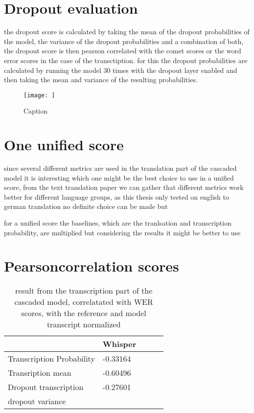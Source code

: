 \section{Dropout evaluation}
the dropout score is calculated by taking the mean of the dropout probabilities of the model, the variance of the dropout probabilities and a combination of both, the dropout score is then pearson correlated with the comet scores or the word error scores in the case of the transctiption. 
for this the dropout probabilities are calculated by running the model 30 times with the dropout layer enabled and then taking the mean and variance of the resulting probabilities. 

\begin{figure}
    \centering
    \texttt{[image: ]}
    \caption{Caption}
    \label{fig:dropout scatter plot}
\end{figure}

\section{One unified score}
since several different metrics are used in the translation part of the cascaded model it is interesting which one might be the best choice to use in a unified score, from the text translation paper \cite{fomicheva2020unsupervised} we can gather that different metrics work better for different language groups, as this thesis only tested on english to german translation no definite choice can be made but

for a unified score the baselines, which are the tranlsation and transcription probability, are multiplied
but considering the results it might be better to use 

\section{Pearsoncorrelation scores}
\begin{table}[ht]
  \begin{tabular}
  {l|llll}
  &  Whisper \\ \hline
  Transcription Probability& -0.33164 \\
  Transription mean & -0.60496 \\ \hline
  Dropout transcription & -0.27601 \\
  dropout variance &  \\
  \end{tabular}
  \label{transcription results}
  \caption{result from the transcription part of the cascaded model, correlatated with WER scores, with the reference and model transcript normalized}
\end{table}

